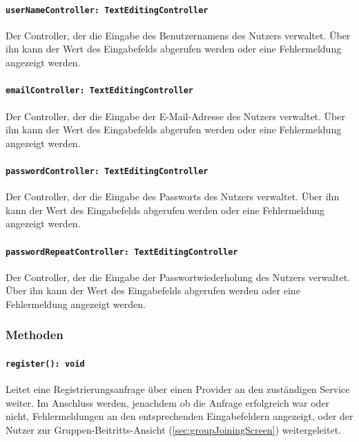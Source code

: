 \documentclass{entwurfsheft}
\begin{document}
\begin{sloppypar}
\paragraph{\texttt{userNameController: TextEditingController}}
Der Controller, der die Eingabe des Benutzernamens des Nutzers verwaltet. Über ihn kann der Wert des Eingabefelds abgerufen werden oder eine Fehlermeldung angezeigt werden.
\paragraph{\texttt{emailController: TextEditingController}}
Der Controller, der die Eingabe der E-Mail-Ad\-resse des Nutzers verwaltet. Über ihn kann der Wert des Eingabefelds abgerufen werden oder eine Fehlermeldung angezeigt werden.
\paragraph{\texttt{passwordController: TextEditingController}}
Der Controller, der die Eingabe des Passworts des Nutzers verwaltet. Über ihn kann der Wert des Eingabefelds abgerufen werden oder eine Fehlermeldung angezeigt werden.
\paragraph{\texttt{passwordRepeatController: TextEditingController}}
Der Controller, der die Eingabe der Passwortwiederholung des Nutzers verwaltet. Über ihn kann der Wert des Eingabefelds abgerufen werden oder eine Fehlermeldung angezeigt werden.
\subsubsection*{Methoden}
\paragraph{\texttt{register(): void}}
Leitet eine Registrierungsanfrage über einen Provider an den zuständigen Service weiter. Im Anschluss werden, jenachdem ob die Anfrage erfolgreich war oder nicht, Fehlermeldungen an den entsprechenden Eingabefeldern angezeigt, oder der Nutzer zur Gruppen-Beitritts-Ansicht (\ref{sec:groupJoiningScreen}) weitergeleitet.
\newpage


\end{sloppypar}
\end{document}
